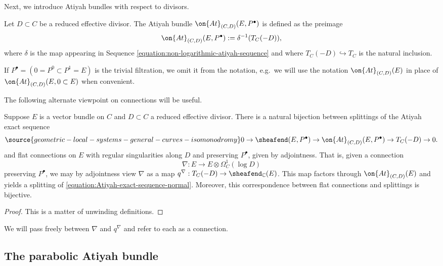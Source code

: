 Next, we introduce Atiyah bundles with respect to divisors.
\begin{definition}
\notready
	\label{definition:atiyah-bundle-divisor}
Let $D\subset C$ be a reduced effective divisor.
The Atiyah bundle $\on{At}_{(C,D)}(E,P^\bullet)$ is defined as the preimage
$$\on{At}_{(C,D)}(E,P^\bullet):=\delta^{-1}(T_C(-D)),$$ where $\delta$ is the map appearing in Sequence \eqref{equation:non-logarithmic-atiyah-sequence} and where $T_C(-D)\hookrightarrow T_C$ is the natural inclusion.

If $P^\bullet = (0 = P^0 \subset P^1 = E)$ is the trivial filtration, we omit it from the notation, e.g.~we will use the notation $\on{At}_{(C,D)}(E)$
in place of $\on{At}_{(C,D)}(E, 0 \subset E)$
when convenient.
\end{definition}
The
following alternate viewpoint on connections will be useful.
\begin{proposition}
\notready\label{proposition:atiyah-splittings}
Suppose $E$ is a vector bundle on $C$ and $D \subset C$ a reduced
effective divisor.
    There is a natural bijection between splittings of the Atiyah exact sequence
    \begin{equation}
	    \label{equation:Atiyah-exact-sequence-normal}
\source{geometric-local-systems-general-curves-isomonodromy}
	    0\to \sheafend(E, P^\bullet)\to \on{At}_{(C,D)}(E, P^\bullet)\to T_C(-D)\to
    0.
    \end{equation}
	and flat connections on $E$ with
    regular singularities along $D$ and preserving $P^\bullet$, given by
    adjointness. That is, given a connection $$\nabla: E\to E\otimes
    \Omega^1_C(\log D)$$ preserving $P^\bullet$, we may by adjointness view
    $\nabla$ as a map $q^\nabla: T_C(-D)\to
    \sheafend_{\mathbb{C}}(E)$.
    This map factors through $\on{At}_{(C,D)}(E)$ and
    yields a splitting of \eqref{equation:Atiyah-exact-sequence-normal}.
    Moreover, this correspondence between flat connections and splittings is bijective.
\end{proposition}
\begin{proof}
    This is a matter of unwinding definitions.
\end{proof}
We will pass freely between $\nabla$ and $q^\nabla$ and refer to each as a connection.
\subsection{The parabolic Atiyah bundle}
\label{subsection:parabolic-atiyah}

